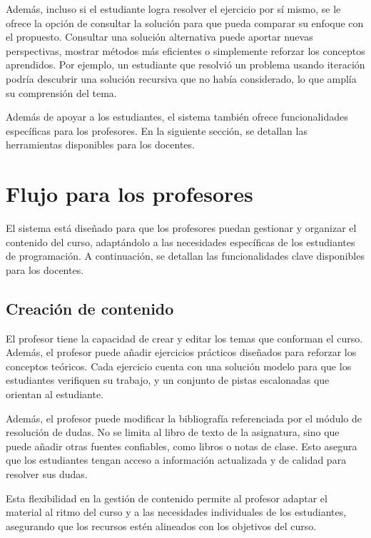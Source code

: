 \documentclass{article}
\begin{document}
Además, incluso si el estudiante logra resolver el ejercicio por sí mismo, se le ofrece la opción de consultar la solución para que pueda comparar su enfoque con el propuesto. Consultar una solución alternativa puede aportar nuevas perspectivas, mostrar métodos más eficientes o simplemente reforzar los conceptos aprendidos. Por ejemplo, un estudiante que resolvió un problema usando iteración podría descubrir una solución recursiva que no había considerado, lo que amplía su comprensión del tema.

Además de apoyar a los estudiantes, el sistema también ofrece funcionalidades específicas para los profesores. En la siguiente sección, se detallan las herramientas disponibles para los docentes.

\section{Flujo para los profesores}\label{sec:teachers}

El sistema está diseñado para que los profesores puedan gestionar y organizar el contenido del curso, adaptándolo a las necesidades específicas de los estudiantes de programación. A continuación, se detallan las funcionalidades clave disponibles para los docentes.

\subsection{Creación de contenido}

El profesor tiene la capacidad de crear y editar los temas que conforman el curso. Además, el profesor puede añadir ejercicios prácticos diseñados para reforzar los conceptos teóricos. Cada ejercicio cuenta con una solución modelo para que los estudiantes verifiquen su trabajo, y un conjunto de pistas escalonadas que orientan al estudiante.

Además, el profesor puede modificar la bibliografía referenciada por el módulo de resolución de dudas. No se limita al libro de texto de la asignatura, sino que puede añadir otras fuentes confiables, como libros o notas de clase. Esto asegura que los estudiantes tengan acceso a información actualizada y de calidad para resolver sus dudas.

Esta flexibilidad en la gestión de contenido permite al profesor adaptar el material al ritmo del curso y a las necesidades individuales de los estudiantes, asegurando que los recursos estén alineados con los objetivos del curso.
\end{document}
